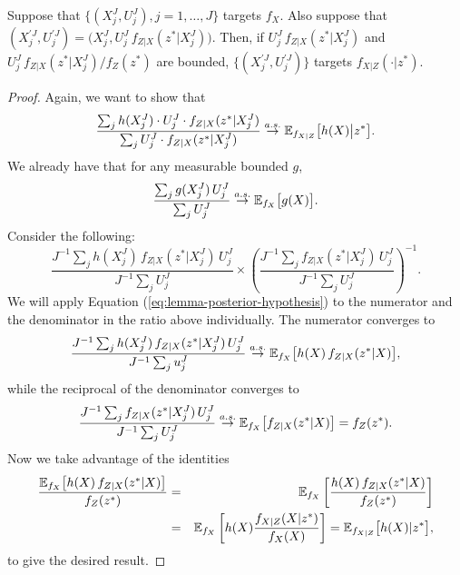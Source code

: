 \begin{lem}
    \label{lem:posterior-proper-weights}
    Suppose that $\{(X_j^J,U_j^J),j=1,\dots,J\}$ targets $f_X$.
    Also suppose that $(X^{\prime J}_j,U^{\prime J}_j) = \big(X_j^J,U_j^J \, f_{Z|X}(z^*|X_j^J)\big)$. 
    Then, if $U_j^J \, f_{Z|X}(z^*|X_j^J)$ and $U_j^J \, f_{Z|X}(z^*|X_j^J) \big/ f_Z(z^*)$ are bounded, $\{(X^{\prime J}_j,U^{\prime J}_j)\}$ targets $f_{X|Z}(\cdot | z^*)$.
\end{lem}

\begin{proof}
    Again, we want to show that
     \begin{equation}
     \frac{\sum_j h(X_j^J) \cdot U_j^J \cdot f_{Z|X}(z^*|X_j^J)}{\sum_j U_j^J \cdot f_{Z|X}(z^*|X_j^J)} \stackrel{a.s.}{\to} \mathbb{E}_{f_{X|Z}}\big[h(X)\big|z^*\big].
     \end{equation}
    We already have that for any measurable bounded $g$,
    \begin{equation}
        \frac{\sum_j g(X_j^J)\, U_j^J}{\sum_j U_j^J} \stackrel{a.s.}{\to} \mathbb{E}_{f_X}\big[g(X)\big].
        \label{eq:lemma-posterior-hypothesis}
    \end{equation}
    Consider the following:
    \begin{equation}
    \frac{J^{-1} \sum_j h(X_j^J) \, f_{Z|X}(z^*|X_j^J)\,  {U}_j^{J}}{J^{-1} \sum_j {U}_j^{J}}
    \times \left( \frac{J^{-1} \sum_j f_{Z|X}(z^*|X_j^J) \, {U}_j^{J}}{J^{-1} \sum_j {U}_j^{J}} \right)^{-1}.
    \end{equation}
    We will apply Equation (\ref{eq:lemma-posterior-hypothesis}) to the numerator and the denominator in the ratio above individually. The numerator converges to 
    \begin{equation}
    \frac{J^{-1} \sum_j h(X_j^J) \, f_{Z|X}(z^*|X_j^J) \, {U}_j^{J}}{J^{-1} \sum_j {u}_j^{J}} \stackrel{a.s.}{\to} \mathbb{E}_{f_X}\big[h(X)\, f_{Z|X}(z^*|X)\big],
    \end{equation}
    while the reciprocal of the denominator converges to 
    \begin{equation} 
    \frac{J^{-1} \sum_j f_{Z|X}(z^*|X_j^J) \, {U}_j^{J}}{J^{-1} \sum_j {U}_j^{J}}  \stackrel{a.s.}{\to} \mathbb{E}_{f_X}\big[f_{Z|X}(z^*|X)\big] = f_Z(z^*).
    \end{equation}
    Now we take advantage of the identities
    \begin{eqnarray}
    \frac{\mathbb{E}_{f_X}\big[h(X)\, f_{Z|X}(z^*|X)\big]}{f_Z(z^*)} &=& \mathbb{E}_{f_X}\left[\frac{h(X)\, f_{Z|X}(z^*|X)}{f_Z(z^*)}\right] 
    \\
    &=& \mathbb{E}_{f_X}\left[h(X)\frac{f_{X|Z}(X|z^*)}{f_X(X)}\right] =  \mathbb{E}_{f_{X|Z}}\big[h(X)|z^*\big],
    \end{eqnarray}
    to give the desired result.
    

\end{proof}

